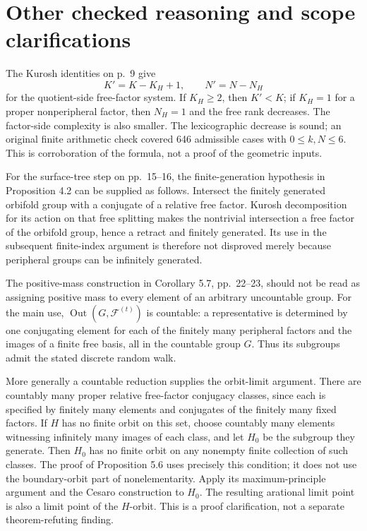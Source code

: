 \documentclass[10pt]{article}
\begin{document}
\section*{Other checked reasoning and scope clarifications}
The Kurosh identities on p. 9 give \[K'=K-K_H+1,\qquad N'=N-N_H\] for the quotient-side free-factor system. If \(K_H\geq2\), then \(K'<K\); if \(K_H=1\) for a proper nonperipheral factor, then \(N_H=1\) and the free rank decreases. The factor-side complexity is also smaller. The lexicographic decrease is sound; an original finite arithmetic check covered 646 admissible cases with \(0\leq k,N\leq6\). This is corroboration of the formula, not a proof of the geometric inputs.\par
For the surface-tree step on pp. 15–16, the finite-generation hypothesis in Proposition 4.2 can be supplied as follows. Intersect the finitely generated orbifold group with a conjugate of a relative free factor. Kurosh decomposition for its action on that free splitting makes the nontrivial intersection a free factor of the orbifold group, hence a retract and finitely generated. Its use in the subsequent finite-index argument is therefore not disproved merely because peripheral groups can be infinitely generated.\par
The positive-mass construction in Corollary 5.7, pp. 22–23, should not be read as assigning positive mass to every element of an arbitrary uncountable group. For the main use, \(\operatorname{Out}(G,\mathcal F^{(t)})\) is countable: a representative is determined by one conjugating element for each of the finitely many peripheral factors and the images of a finite free basis, all in the countable group \(G\). Thus its subgroups admit the stated discrete random walk.\par
More generally a countable reduction supplies the orbit-limit argument. There are countably many proper relative free-factor conjugacy classes, since each is specified by finitely many elements and conjugates of the finitely many fixed factors. If \(H\) has no finite orbit on this set, choose countably many elements witnessing infinitely many images of each class, and let \(H_0\) be the subgroup they generate. Then \(H_0\) has no finite orbit on any nonempty finite collection of such classes. The proof of Proposition 5.6 uses precisely this condition; it does not use the boundary-orbit part of nonelementarity. Apply its maximum-principle argument and the Cesaro construction to \(H_0\). The resulting arational limit point is also a limit point of the \(H\)-orbit. This is a proof clarification, not a separate theorem-refuting finding.\par
\end{document}
